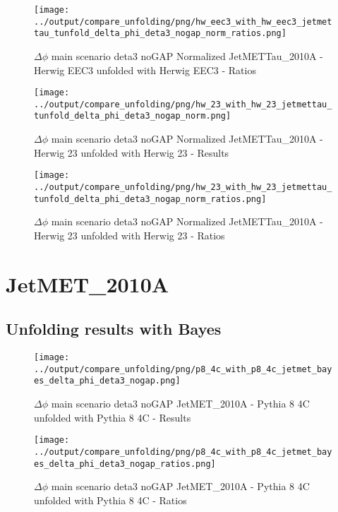\documentclass[11pt]{book}
\begin{document}
\begin{figure}[ht]
\centering
\texttt{[image: ../output/compare\_unfolding/png/hw\_eec3\_with\_hw\_eec3\_jetmettau\_tunfold\_delta\_phi\_deta3\_nogap\_norm\_ratios.png]}
\caption{$\Delta\phi$ main scenario deta3 noGAP Normalized JetMETTau\_2010A - Herwig EEC3 unfolded with Herwig EEC3 - Ratios}
\label{hw_eec3_hw_eec3_jetmettau_tunfold_delta_phi_deta3_nogap_norm_b}
\end{figure}

\begin{figure}[ht]
\centering
\texttt{[image: ../output/compare\_unfolding/png/hw\_23\_with\_hw\_23\_jetmettau\_tunfold\_delta\_phi\_deta3\_nogap\_norm.png]}
\caption{$\Delta\phi$ main scenario deta3 noGAP Normalized JetMETTau\_2010A - Herwig 23 unfolded with Herwig 23 - Results}
\label{hw_23_hw_23_jetmettau_tunfold_delta_phi_deta3_nogap_norm_a}
\end{figure}

\begin{figure}[ht]
\centering
\texttt{[image: ../output/compare\_unfolding/png/hw\_23\_with\_hw\_23\_jetmettau\_tunfold\_delta\_phi\_deta3\_nogap\_norm\_ratios.png]}
\caption{$\Delta\phi$ main scenario deta3 noGAP Normalized JetMETTau\_2010A - Herwig 23 unfolded with Herwig 23 - Ratios}
\label{hw_23_hw_23_jetmettau_tunfold_delta_phi_deta3_nogap_norm_b}
\end{figure}


\clearpage
\section{JetMET\_2010A}
\subsection{Unfolding results with Bayes}

\begin{figure}[ht]
\centering
\texttt{[image: ../output/compare\_unfolding/png/p8\_4c\_with\_p8\_4c\_jetmet\_bayes\_delta\_phi\_deta3\_nogap.png]}
\caption{$\Delta\phi$ main scenario deta3 noGAP JetMET\_2010A - Pythia 8 4C unfolded with Pythia 8 4C - Results}
\label{p8_p8_jetmet_bayes_delta_phi_deta3_nogap_a}
\end{figure}

\begin{figure}[ht]
\centering
\texttt{[image: ../output/compare\_unfolding/png/p8\_4c\_with\_p8\_4c\_jetmet\_bayes\_delta\_phi\_deta3\_nogap\_ratios.png]}
\caption{$\Delta\phi$ main scenario deta3 noGAP JetMET\_2010A - Pythia 8 4C unfolded with Pythia 8 4C - Ratios}
\label{p8_p8_jetmet_bayes_delta_phi_deta3_nogap_b}
\end{figure}
\end{document}
